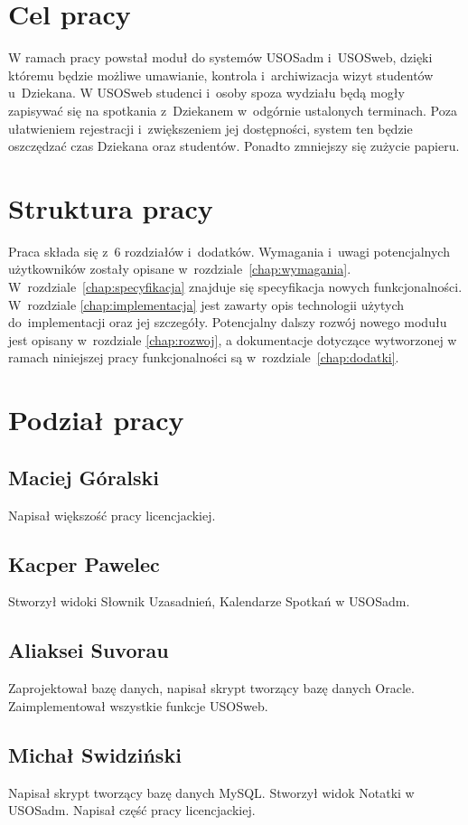 \documentclass[licencjacka]{pracamgr}
\begin{document}
\section{Cel pracy}
W ramach pracy powstał moduł do systemów USOSadm i~USOSweb, dzięki któremu będzie możliwe umawianie, kontrola i~archiwizacja wizyt studentów u~Dziekana. W USOSweb studenci i~osoby spoza wydziału będą mogły zapisywać się na spotkania z~Dziekanem w~odgórnie ustalonych terminach. Poza ułatwieniem rejestracji i~zwiększeniem jej dostępności, system ten będzie oszczędzać czas Dziekana oraz studentów. Ponadto zmniejszy się zużycie papieru.
\section{Struktura pracy}
Praca składa się z~6 rozdziałów i~dodatków.
Wymagania i~uwagi potencjalnych użytkowników zostały opisane w~rozdziale~\ref{chap:wymagania}.
W~rozdziale~\ref{chap:specyfikacja} znajduje się specyfikacja nowych funkcjonalności. W~rozdziale \ref{chap:implementacja} jest zawarty opis technologii użytych do~implementacji oraz jej szczegóły. Potencjalny dalszy rozwój nowego modułu jest opisany w~rozdziale \ref{chap:rozwoj}, a dokumentacje dotyczące wytworzonej w ramach niniejszej pracy funkcjonalności są w~rozdziale~\ref{chap:dodatki}. 

\section{Podział pracy}
\subsection{Maciej Góralski}
Napisał większość pracy licencjackiej.
\subsection{Kacper Pawelec}
Stworzył widoki Słownik Uzasadnień, Kalendarze Spotkań w USOSadm.
\subsection{Aliaksei Suvorau}
Zaprojektował bazę danych, napisał skrypt tworzący bazę danych Oracle. Zaimplementował wszystkie funkcje USOSweb.
\subsection{Michał Swidziński}
Napisał skrypt tworzący bazę danych MySQL. Stworzył widok Notatki w USOSadm. Napisał część pracy licencjackiej.
\end{document}
